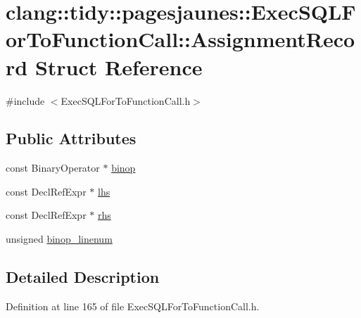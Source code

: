 \hypertarget{structclang_1_1tidy_1_1pagesjaunes_1_1_exec_s_q_l_for_to_function_call_1_1_assignment_record}{}\section{clang\+:\+:tidy\+:\+:pagesjaunes\+:\+:Exec\+S\+Q\+L\+For\+To\+Function\+Call\+:\+:Assignment\+Record Struct Reference}
\label{structclang_1_1tidy_1_1pagesjaunes_1_1_exec_s_q_l_for_to_function_call_1_1_assignment_record}


{\ttfamily \#include $<$Exec\+S\+Q\+L\+For\+To\+Function\+Call.\+h$>$}

\subsection*{Public Attributes}
\begin{DoxyCompactItemize}
\item 
const Binary\+Operator $\ast$ \hyperlink{structclang_1_1tidy_1_1pagesjaunes_1_1_exec_s_q_l_for_to_function_call_1_1_assignment_record_ad2ec6aad51c69802327434e8166f3552}{binop}
\item 
const Decl\+Ref\+Expr $\ast$ \hyperlink{structclang_1_1tidy_1_1pagesjaunes_1_1_exec_s_q_l_for_to_function_call_1_1_assignment_record_a6d19043ebdea76063b73d07adf824bf7}{lhs}
\item 
const Decl\+Ref\+Expr $\ast$ \hyperlink{structclang_1_1tidy_1_1pagesjaunes_1_1_exec_s_q_l_for_to_function_call_1_1_assignment_record_a484517affe29aba48e095d7bd9ca9b57}{rhs}
\item 
unsigned \hyperlink{structclang_1_1tidy_1_1pagesjaunes_1_1_exec_s_q_l_for_to_function_call_1_1_assignment_record_a1907483253ab0039e8450015ecb976f1}{binop\+\_\+linenum}
\end{DoxyCompactItemize}


\subsection{Detailed Description}


Definition at line 165 of file Exec\+S\+Q\+L\+For\+To\+Function\+Call.\+h.



